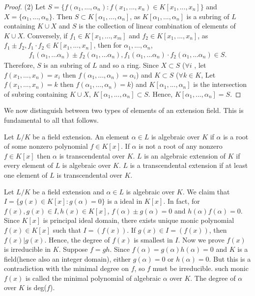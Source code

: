 \begin{proof}
    (2) Let $S=\{f(\alpha_1,...,\alpha_n):f(x_1,...,x_n)\in K[x_1,...,x_n]\}$ and $X=\{\alpha_1,...,\alpha_n\}$. 
    Then $S\subset K[\alpha_1,...,\alpha_n]$,   
    as $K[\alpha_1,...,\alpha_n]$ is a subring of $L$ containing $K\cup X$ and $S$ is the collection of linear combination of elements of $K\cup X$.
    Conversely, if $f_1\in K[x_1,...,x_m]$ and $f_2\in K[x_1,...,x_n]$, as $f_1\pm f_2, f_1\cdot f_2 \in K[x_1,...,x_n]$, 
    then for $\alpha_1,...,\alpha_n$, 
    \begin{align*}
        f_1(\alpha_1,...\alpha_n) \pm f_2(\alpha_1,...\alpha_n) , f_1(\alpha_1,...\alpha_n) \cdot f_2(\alpha_1,...\alpha_n)\in S.
    \end{align*}
    Therefore, $S$ is an subring of $L$ and so a ring.
    Since $X\subset S$ ($\forall i$ , let $f(x_1,...,x_n)=x_i$ then $f(\alpha_1,...,\alpha_n)=\alpha_i$) and $K\subset S$ ($\forall k\in K$, Let $f(x_1,...,x_n)=k$ then $f(\alpha_1,...,\alpha_n)=k$)
    and $K[\alpha_1,...,\alpha_n]$ is the intersection of subring containing $K\cup X$, 
    $K[\alpha_1,...,\alpha_n]\subset S$. Hence, $K[\alpha_1,...,\alpha_n]=S$. 
\end{proof}


We now distinguish between two types of elements of an extension field.
This is fundamental to all that follows.

\begin{definition}{}{}
    Let $L/K$ be a field extension. 
    An element $\alpha\in L$ is algebraic over $K$ if $\alpha$ is a root of some nonzero polynomial $f\in K[x]$.
    If $\alpha$ is not a root of any nonzero $f\in K[x]$ then $\alpha$ is transcendental over $K$.
    $L$ is an algebraic extension of $K$ if every element of $L$ is algebraic over $K$.
    $L$ is a transcendental extension if at least one element of $L$ is transcendental over $K$.
\end{definition}


Let $L/K$ be a field extension and $\alpha\in L$ is algebraic over $K$.
We claim that $I=\{g(x)\in K[x]:g(\alpha)=0\}$ is a ideal in $K[x]$. 
In fact, for $f(x),g(x)\in I, h(x)\in K[x]$, $f(\alpha)\pm g(\alpha)=0$ and $h(\alpha)f(\alpha)=0$.
Since $K[x]$ is principal ideal domain, there exists unique monic polynomial $f(x)\in K[x]$
such that $I=(f(x))$. If $g(x)\in I=(f(x))$, then $f(x)|g(x)$. Hence, the degree of $f(x)$ is smallest in $I$. 
Now we prove $f(x)$ is irreducible in $K$. Suppose $f = gh$. 
Since $f(\alpha)=g(\alpha)h(\alpha)=0$ and $K$ is a field(hence also an integer domain), either $g(\alpha)=0$ or $h(\alpha)=0$. 
But this is a contradiction with the minimal degree on $f$, so $f$ must be irreducible.
such monic $f(x)$ is called the minimal polynomial of algebraic $\alpha$ over $K$.
The degree of $\alpha$ over $K$ is deg($f$).

